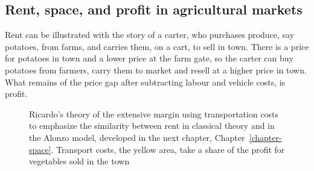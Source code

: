 

\subsection{Rent, space, and profit in agricultural markets}
Rent  can be illustrated with the story of a carter, who purchases produce, say potatoes, from farms, and carries them, on a cart, to sell in town.
There is a price for potatoes in town and a lower price at the farm gate, so the carter can buy potatoes from farmers, carry them to market and resell at a higher price in town. What remains of the price gap after subtracting labour and vehicle costs, is profit.  

\begin{figure}[htb]
\begin{center}
    
\caption[Ricardo's theory of extensive margin.]{Ricardo's theory of the extensive margin using transportation costs to emphasize the similarity between rent in classical theory and in the Alonzo model, developed in the next chapter, Chapter~\ref{chapter-space}. Transport costs, the yellow area, take a share of the profit for vegetables sold in the town}
\label{fig-rent-ricardo}
\end{center}
\end{figure}

